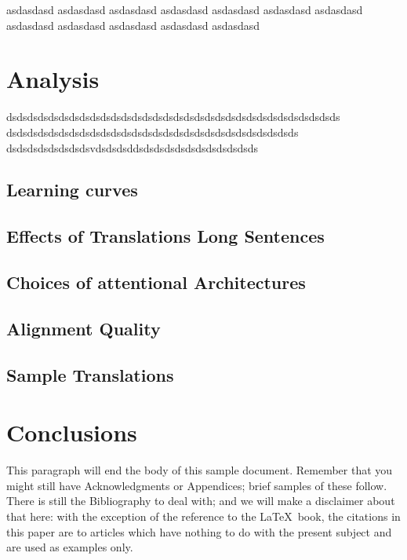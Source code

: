 asdasdasd asdasdasd
asdasdasd
asdasdasd
asdasdasd
asdasdasd
asdasdasd asdasdasd
asdasdasd
asdasdasd
asdasdasd
asdasdasd

\section{Analysis}
dsdsdsdsdsdsdsdsdsdsdsdsdsdsdsdsdsdsdsdsdsdsdsdsdsdsdsdsdsdsdsds
dsdsdsdsdsdsdsdsdsdsdsdsdsdsdsdsdsdsdsdsdsdsdsdsdsdsdsds
dsdsdsdsdsdsdsdsvdsdsdsddsdsdsdsdsdsdsdsdsdsdsds

\subsection{Learning curves}

\subsection{Effects of Translations Long Sentences}

\subsection{Choices of attentional Architectures}

\subsection{Alignment Quality}

\subsection{Sample Translations}



\section{Conclusions}
This paragraph will end the body of this sample document.
Remember that you might still have Acknowledgments or
Appendices; brief samples of these
follow.  There is still the Bibliography to deal with; and
we will make a disclaimer about that here: with the exception
of the reference to the \LaTeX\ book, the citations in
this paper are to articles which have nothing to
do with the present subject and are used as
examples only.


